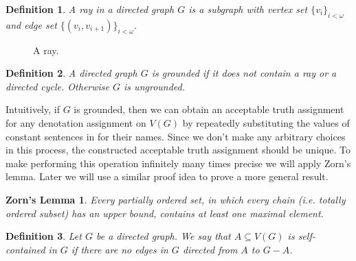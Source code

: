 \documentclass[12pt]{article}
\newtheorem{defn}{Definition}
\newtheorem*{zorn}{Zorn's Lemma}
\theoremstyle{remark}
\begin{document}
\begin{defn}
A \emph{ray} in a directed graph $G$ is a subgraph with vertex set $\{v_i\}_{i < \omega}$ and edge set $\{(v_i, v_{i + 1})\}_{i < \omega}$.
\end{defn}

\begin{figure}[h]
\centering
{}
\caption{A ray.}
\end{figure}

\begin{defn}
A directed graph $G$ is \emph{grounded} if it does not contain a ray or a directed cycle.  Otherwise $G$ is \emph{ungrounded}.
\end{defn}

Intuitively, if $G$ is grounded, then we can obtain an acceptable truth assignment for any denotation assignment on $V(G)$ by repeatedly substituting the values of constant sentences in for their names.  Since we don't make any arbitrary choices in this process, the constructed acceptable truth assignment should be unique.  To make performing this operation infinitely many times precise we will apply Zorn's lemma.  Later we will use a similar proof idea to prove a more general result.

\begin{zorn}
Every partially ordered set, in which every chain (i.e. totally ordered subset) has an upper bound, contains at least one maximal element.
\end{zorn}

\begin{defn}
Let $G$ be a directed graph.  We say that $A \subseteq V(G)$ is \emph{self-contained} in $G$ if there are no edges in $G$ directed from $A$ to $G - A$.  
\end{defn}
\end{document}
